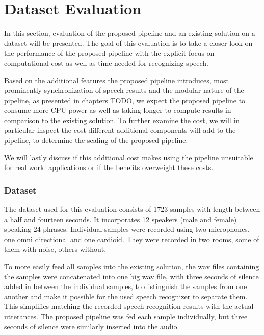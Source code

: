

\section{Dataset Evaluation}
\label{eval:dataset}

In this section, evaluation of the proposed pipeline and an existing solution on a dataset will be presented.
The goal of this evaluation is to take a closer look on the performance of the proposed pipeline with the explicit focus on computational cost as well as time needed for recognizing speech.

Based on the additional features the proposed pipeline introduces, most prominently synchronization of speech results and the modular nature of the pipeline, as presented in chapters TODO, we expect the proposed pipeline to consume more CPU power as well as taking longer to compute results in comparison to the existing solution.
To further examine the cost, we will in particular inspect the cost different additional components will add to the pipeline, to determine the scaling of the proposed pipeline.

We will lastly discuss if this additional cost makes using the pipeline unsuitable for real world applications or if the benefits overweight these costs.

\subsubsection{Dataset}
\label{eval:dataset:dataset}

The dataset used for this evaluation consists of 1723 samples with length between a half and fourteen seconds.
It incorporates 12 speakers (male and female) speaking 24 phrases. 
Individual samples were recorded using two microphones, one omni directional and one cardioid.
They were recorded in two rooms, some of them with noise, others without.

To more easily feed all samples into the existing solution, the wav files containing the samples were concatenated into one big wav file, with three seconds of silence added in between the individual samples, to distinguish the samples from one another and make it possible for the used speech recognizer to separate them.
This simplifies matching the recorded speech recognition results with the actual utterances.
The proposed pipeline was fed each sample individually, but three seconds of silence were similarly inserted into the audio.

